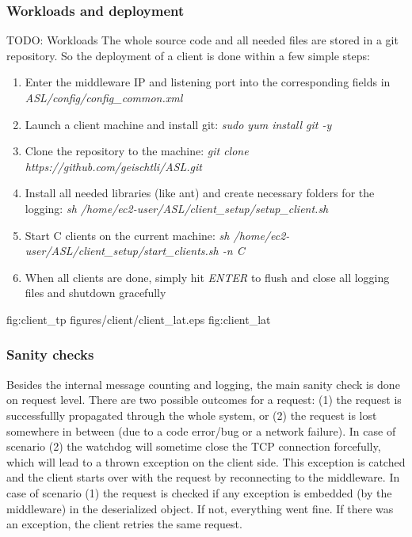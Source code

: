 \documentclass[11pt]{article}
\begin{document}
\subsubsection{Workloads and deployment}\label{sec:workloads-and-deployment}
TODO: Workloads\newline
The whole source code and all needed files are stored in a git repository. So the deployment of a client is done within a few simple steps:
\begin{enumerate}
	\item Enter the middleware IP and listening port into the corresponding fields in \newline\textit{ASL/config/config\_common.xml}
	\item Launch a client machine and install git: \textit{sudo yum install git -y}
	\item Clone the repository to the machine: \textit{git clone https://github.com/geischtli/ASL.git}
	\item Install all needed libraries (like ant) and create necessary folders for the logging: \newline \textit{sh /home/ec2-user/ASL/client\_setup/setup\_client.sh}
	\item Start C clients on the current machine: \newline\textit{sh /home/ec2-user/ASL/client\_setup/start\_clients.sh -n C}
	\item When all clients are done, simply hit \textit{ENTER} to flush and close all logging files and shutdown gracefully
\end{enumerate}
 {} {fig:client_tp}
{figures/client/client_lat.eps} {} {fig:client_lat}

\subsubsection{Sanity checks}\label{sec:sanity-checks}
Besides the internal message counting and logging, the main sanity check is done on request level. There are two possible outcomes for a request: (1) the request is successfullly propagated through the whole system, or (2) the request is lost somewhere in between (due to a code error/bug or a network failure). In case of scenario (2) the watchdog will sometime close the TCP connection forcefully, which will lead to a thrown exception on the client side. This exception is catched and the client starts over with the request by reconnecting to the middleware. In case of scenario (1) the request is checked if any exception is embedded (by the middleware) in the deserialized object. If not, everything went fine. If there was an exception, the client retries the same request.
\end{document}
